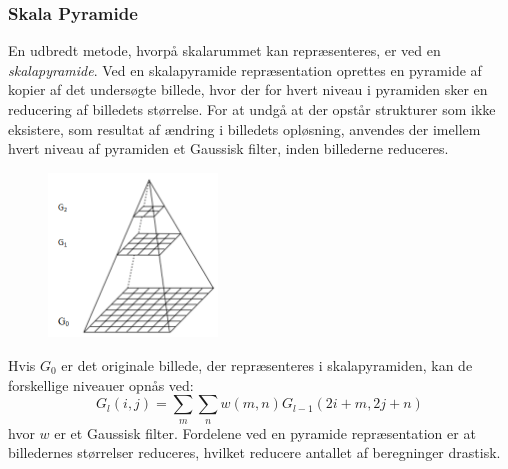 \subsubsection*{Skala Pyramide}
En udbredt metode, hvorpå skalarummet kan repræsenteres, er ved en \textit{skalapyramide}. Ved en skalapyramide repræsentation oprettes en pyramide af kopier af det undersøgte billede, hvor der for hvert niveau i pyramiden sker en reducering af billedets størrelse. For at undgå at der opstår strukturer som ikke eksistere, som resultat af ændring i billedets opløsning, anvendes der imellem hvert niveau af pyramiden et Gaussisk filter, inden billederne reduceres. \begin{figure}[H]
    \centering
    \includegraphics[width=0.40\textwidth]{fig/40.png}
     \vspace{-1em}
    \begin{center}    
       \caption{\textcolor{gray}{\footnotesize \textit{ }}}
    \label{fig:scalerepdiff}
     \end{center}
     \vspace{-2.5em}
  \end{figure} \noindent
Hvis $G_0$ er det originale billede, der repræsenteres i skalapyramiden, kan de forskellige niveauer opnås ved:
\begin{equation}
G_l(i,j)=\sum\limits_{m}\sum\limits_{n}w(m,n)G_{l-1}(2i+m,2j+n)
\end{equation}
hvor $w$ er et Gaussisk filter. Fordelene ved en pyramide repræsentation er at billedernes størrelser reduceres, hvilket reducere antallet af beregninger drastisk.
